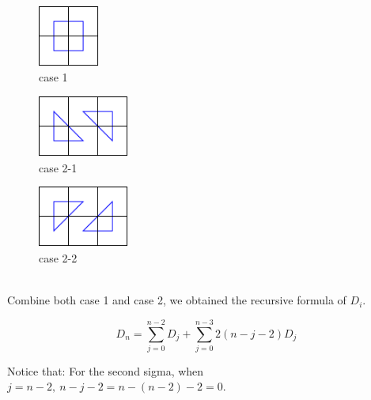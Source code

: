 \begin{minipage}{\linewidth}
    \centering
    \begin{minipage}{0.32\linewidth}
        \begin{figure}[H]
            \includegraphics[width=2cm]{picture/case1.png}
            \caption{case 1}
            \label{case1}
        \end{figure}
    \end{minipage}
    \begin{minipage}{0.32\linewidth}
        \begin{figure}[H]
            \includegraphics[width=3cm]{picture/case2_1.png}
            \caption{case 2-1}
            \label{case2-1}
        \end{figure}
    \end{minipage}
    \begin{minipage}{0.32\linewidth}
        \begin{figure}[H]
            \includegraphics[width=3cm]{picture/case2_2.png}
            \caption{case 2-2}
            \label{case2-2}
        \end{figure}
    \end{minipage}
\end{minipage}

\ \\

Combine both case 1 and case 2, we obtained the recursive formula of $D_i$.

$$D_n = \sum\limits_{j=0}^{n-2}D_j + \sum\limits_{j=0}^{n-3}2(n-j-2)D_j$$

Notice that: For the second sigma, when $j = n-2,\ n-j-2 = n-(n-2)-2 = 0$.\\


